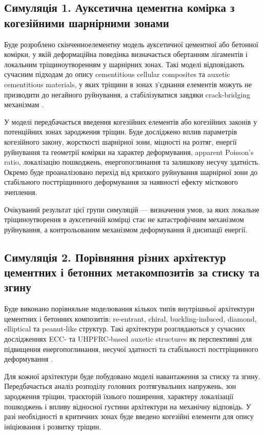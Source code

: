 \documentclass[12pt,a4paper]{article}
\begin{document}
\subsection*{Симуляція 1. Ауксетична цементна комірка з когезійними шарнірними зонами}

Буде розроблено скінченноелементну модель ауксетичної цементної або бетонної комірки, у якій деформаційна поведінка визначається обертанням лігаментів і локальним тріщиноутворенням у шарнірних зонах. Такі моделі відповідають сучасним підходам до опису cementitious cellular composites та auxetic cementitious materials, у яких тріщини в зонах з'єднання елементів можуть не призводити до негайного руйнування, а стабілізуватися завдяки crack-bridging механізмам \cite{Xu2020,Xie2025}.

У моделі передбачається введення когезійних елементів або когезійних законів у потенційних зонах зародження тріщин. Буде досліджено вплив параметрів когезійного закону, жорсткості шарнірної зони, міцності на розтяг, енергії руйнування та геометрії комірки на характер деформування, apparent Poisson's ratio, локалізацію пошкоджень, енергопоглинання та залишкову несучу здатність. Окремо буде проаналізовано перехід від крихкого руйнування шарнірної зони до стабільного посттріщинного деформування за наявності ефекту місткового зчеплення.

Очікуваний результат цієї групи симуляцій --- визначення умов, за яких локальне тріщиноутворення в ауксетичній комірці стає не катастрофічним механізмом руйнування, а контрольованим механізмом деформування й дисипації енергії.

\subsection*{Симуляція 2. Порівняння різних архітектур цементних і бетонних метакомпозитів за стиску та згину}

Буде виконано порівняльне моделювання кількох типів внутрішньої архітектури цементних і бетонних композитів: re-entrant, chiral, buckling-induced, diamond, elliptical та peanut-like структур. Такі архітектури розглядаються у сучасних дослідженнях ECC- та UHPFRC-based auxetic structures як перспективні для підвищення енергопоглинання, несучої здатності та стабільності посттріщинного деформування \cite{Chen2024,Vo2025}.

Для кожної архітектури буде побудовано моделі навантаження за стиску та згину. Передбачається аналіз розподілу головних розтягувальних напружень, зон зародження тріщин, траєкторій їхнього поширення, характеру локалізації пошкоджень і впливу відносної густини архітектури на механічну відповідь. У разі необхідності в критичних зонах буде введено когезійні елементи для опису ініціювання і розвитку тріщин.
\end{document}
